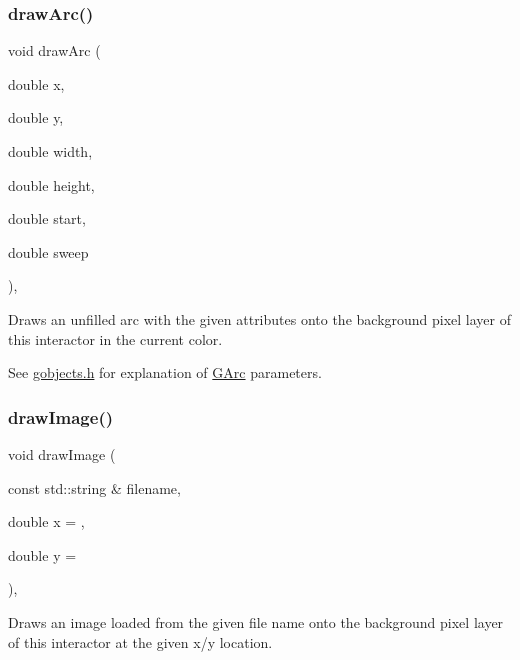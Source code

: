 \mbox{\label{classGDrawingSurface_a38b6fae1045191c57092b49905068144}} 
\subsubsection{\texorpdfstring{draw\+Arc()}{drawArc()}}
{\footnotesize\ttfamily void draw\+Arc (\begin{DoxyParamCaption}\item[{double}]{x,  }\item[{double}]{y,  }\item[{double}]{width,  }\item[{double}]{height,  }\item[{double}]{start,  }\item[{double}]{sweep }\end{DoxyParamCaption})\hspace{0.3cm}{\ttfamily [virtual]}, {\ttfamily [inherited]}}



Draws an unfilled arc with the given attributes onto the background pixel layer of this interactor in the current color. 

See \mbox{\hyperlink{gobjects_8h_source}{gobjects.\+h}} for explanation of \mbox{\hyperlink{classGArc}{G\+Arc}} parameters. \mbox{\label{classGDrawingSurface_abdd4cb1f2c64adc5d03522a1ee30febf}} 
\subsubsection{\texorpdfstring{draw\+Image()}{drawImage()}}
{\footnotesize\ttfamily void draw\+Image (\begin{DoxyParamCaption}\item[{const std\+::string \&}]{filename,  }\item[{double}]{x = {},  }\item[{double}]{y = {} }\end{DoxyParamCaption})\hspace{0.3cm}{\ttfamily [virtual]}, {\ttfamily [inherited]}}



Draws an image loaded from the given file name onto the background pixel layer of this interactor at the given x/y location. 

